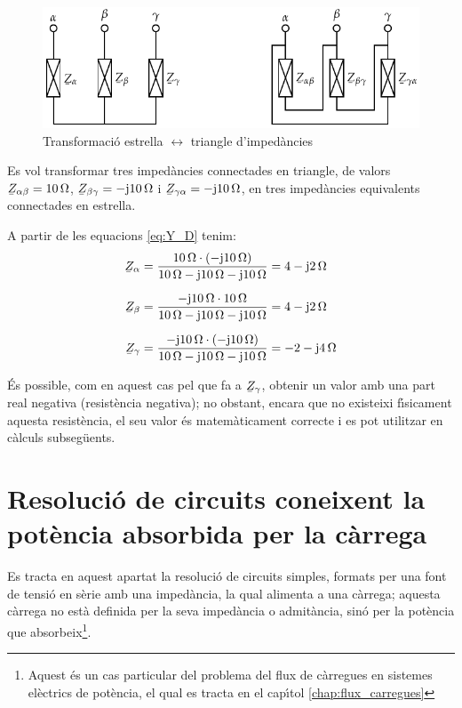 \begin{figure}[htb]
    \centering
    \includegraphics{Imatges/Cap-CalcBas-YD.pdf}
\caption{Transformaci\'{o} estrella $\leftrightarrow$ triangle
d'imped\`{a}ncies} \label{pic:Y_D}
\end{figure}

\begin{exemple}
Es vol transformar tres imped\`{a}ncies connectades en triangle, de
valors $ \cmplx{Z}_{\alpha\beta}=10\unit{\ohm}$,
$\cmplx{Z}_{\beta\gamma}=-\ju10\unit{\ohm}$ i
$\cmplx{Z}_{\gamma\alpha}=-\ju10\unit{\ohm}$, en tres imped\`{a}ncies
equivalents connectades en estrella.

A partir de les equacions \eqref{eq:Y_D}  tenim:
\begin{align*}
   \cmplx{Z}_{\alpha} & = \frac{10\unit{\ohm}\cdot(-\ju10\unit{\ohm})}{10\unit{\ohm} - \ju10\unit{\ohm} - \ju10\unit{\ohm}} = 4 - \ju 2\unit{\ohm} \\[1.5ex]
   \cmplx{Z}_{\beta} & = \frac{-\ju10\unit{\ohm}\cdot10\unit{\ohm}}{10\unit{\ohm} - \ju10\unit{\ohm} - \ju10\unit{\ohm}} = 4 - \ju 2\unit{\ohm} \\[1.5ex]
\cmplx{Z}_{\gamma} &=
\frac{-\ju10\unit{\ohm}\cdot(-\ju10\unit{\ohm})}{10\unit{\ohm} -
\ju10\unit{\ohm} - \ju10\unit{\ohm}} = -2 - \ju 4\unit{\ohm}
\end{align*}

\'{E}s possible, com en aquest cas pel que fa a $\cmplx{Z}_{\gamma}$,
obtenir un valor amb una part real negativa (resist\`{e}ncia negativa);
no obstant, encara que no existeixi f\'{\i}sicament aquesta resist\`{e}ncia,
el seu valor \'{e}s matem\`{a}ticament correcte i es pot utilitzar en
c\`{a}lculs subseg\"{u}ents.
\end{exemple}


\section{Resoluci\'{o} de circuits coneixent la pot\`{e}ncia absorbida per la
c\`{a}rrega}\label{sec:EZS}

Es tracta en aquest apartat la resoluci\'{o} de circuits simples,
formats per una font de tensi\'{o} en s\`{e}rie amb una imped\`{a}ncia, la qual
alimenta a una c\`{a}rrega; aquesta c\`{a}rrega no est\`{a} definida per la seva
imped\`{a}ncia o admit\`{a}ncia, sin\'{o} per la pot\`{e}ncia que absorbeix\footnote{Aquest \'{e}s un cas particular
del problema del flux de c\`{a}rregues en
sistemes el\`{e}ctrics de pot\`{e}ncia, el qual es tracta en el cap\'{\i}tol \ref{chap:flux_carregues}}.

